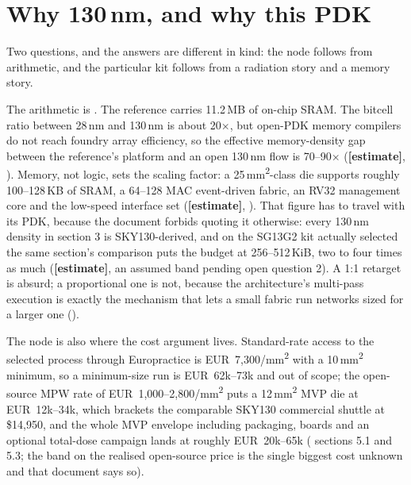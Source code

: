 \section{Why 130\,nm, and why this PDK}
\label{sec:intro-pdk}

Two questions, and the answers are different in kind: the node follows
from arithmetic, and the particular kit follows from a radiation story
and a memory story.

The arithmetic is . The reference carries 11.2\,MB
of on-chip SRAM. The bitcell ratio between 28\,nm and 130\,nm is about
20$\times$, but open-PDK memory compilers do not reach foundry
array efficiency, so the effective memory-density gap between the
reference's platform and an open 130\,nm flow is 70--90$\times$
(\textbf{[estimate]}, ). Memory, not logic, sets
the scaling factor: a 25\,mm\textsuperscript{2}-class die supports
roughly 100--128\,KB of SRAM, a 64--128 MAC
event-driven fabric, an RV32 management core and the low-speed interface
set (\textbf{[estimate]}, ). That figure has to
travel with its PDK, because the document forbids quoting it otherwise:
every 130\,nm density in  section 3 is SKY130-derived, and
on the SG13G2 kit actually selected the same section's comparison puts
the budget at 256--512\,KiB, two to four times as much
(\textbf{[estimate]}, an assumed band pending  open
question 2). A 1:1 retarget is absurd; a proportional
one is not, because the architecture's multi-pass execution is exactly
the mechanism that lets a small fabric run networks sized for a larger
one ().

The node is also where the cost argument lives. Standard-rate access to
the selected process through Europractice is
EUR~7{,}300/mm\textsuperscript{2} with a 10\,mm\textsuperscript{2}
minimum, so a minimum-size run is EUR~62k--73k and out of scope; the
open-source MPW rate of
EUR~1{,}000--2{,}800/mm\textsuperscript{2} puts a
12\,mm\textsuperscript{2} MVP die at EUR~12k--34k, which brackets the
comparable SKY130 commercial shuttle at \$14{,}950, and the whole MVP
envelope including packaging, boards and an optional total-dose campaign
lands at roughly EUR~20k--65k ( sections 5.1 and 5.3;
the band on the realised open-source price is the single biggest cost
unknown and that document says so).

